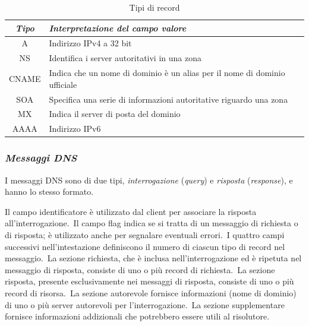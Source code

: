 \begin{table}[H]
    \centering
    \begin{tabular}{|c|p{11 cm}|}
        \hline
        \emph{Tipo} & \emph{Interpretazione del campo valore}                                   \\
        \hline\hline
        A           & Indirizzo IPv4 a 32 bit                                                   \\
        \hline
        NS          & Identifica i server autoritativi in una zona                              \\
        \hline
        CNAME       & Indica che un nome di dominio è un alias per il nome di dominio ufficiale \\
        \hline
        SOA         & Specifica una serie di informazioni autoritative riguardo una zona        \\
        \hline
        MX          & Indica il server di posta del dominio                                     \\
        \hline
        AAAA        & Indirizzo IPv6                                                            \\
        \hline
    \end{tabular}
    \caption*{Tipi di record}
\end{table}

\subsubsection{\emph{Messaggi DNS}}

I messaggi DNS sono di due tipi, \emph{interrogazione} (\emph{query}) e \emph{risposta} (\emph{response}), e hanno lo stesso formato.

Il campo identificatore è utilizzato dal client per associare la risposta all'interrogazione.\
Il campo flag indica se si tratta di un messaggio di richiesta o di risposta; è utilizzato anche per segnalare eventuali errori.\
I quattro campi successivi nell'intestazione definiscono il numero di ciascun tipo di record nel messaggio.\
La sezione richiesta, che è inclusa nell'interrogazione ed è ripetuta nel messaggio di risposta, consiste di uno o più record di richiesta.\
La sezione risposta, presente esclusivamente nei messaggi di risposta, consiste di uno o più record di risorsa.\
La sezione autorevole fornisce informazioni (nome di dominio) di uno o più server autorevoli per l'interrogazione.\
La sezione supplementare fornisce informazioni addizionali che potrebbero essere utili al risolutore.

